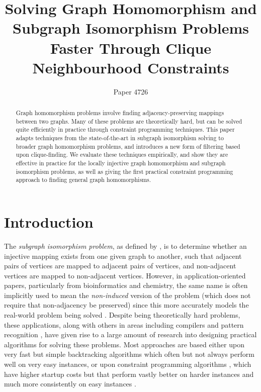 \documentclass{article}
\title{Solving Graph Homomorphism and Subgraph Isomorphism Problems Faster Through Clique Neighbourhood Constraints}
\author{Paper 4726}
\newcommand{\citet}[1]{\citeauthor{#1} \shortcite{#1}}
\begin{document}
\maketitle

\begin{abstract}
    Graph homomorphism problems involve finding adjacency-preserving mappings between two graphs.
    Many of these problems are theoretically hard, but can be solved quite efficiently in practice
    through constraint programming techniques.  This paper adapts techniques from the
    state-of-the-art in subgraph isomorphism solving to broader graph homomorphism problems, and
    introduces a new form of filtering based upon clique-finding. We evaluate these techniques
    empirically, and show they are effective in practice for the locally injective graph
    homomorphism and subgraph isomorphism problems, as well as giving the first practical constraint
    programming approach to finding general graph homomorphisms.
\end{abstract}

\section{Introduction}

The \emph{subgraph isomorphism problem}, as defined by \citet{DBLP:books/fm/GareyJ79}, is to
determine whether an injective mapping exists from one given graph to another, such that adjacent
pairs of vertices are mapped to adjacent pairs of vertices, and non-adjacent vertices are mapped to
non-adjacent vertices.  However, in application-oriented papers, particularly from bioinformatics
and chemistry, the same name is often implicitly used to mean the \emph{non-induced} version of the
problem (which does not require that non-adjacency be preserved) since this more accurately models
the real-world problem being solved \cite{Willett1999,EhrlichR11}. Despite being theoretically hard
problems, these applications, along with
others in areas including compilers \cite{DBLP:conf/cp/BlindellLCS15}
and pattern recognition \cite{DBLP:journals/ijprai/FoggiaPV14},
have given rise to a large amount of research into designing practical algorithms for solving these
problems.  Most approaches are based either upon very fast but simple backtracking algorithms
\cite{DBLP:journals/pami/CordellaFSV04,DBLP:journals/bmcbi/BonniciGPSF13,DBLP:conf/gbrpr/CarlettiFSV17}
which often but not always perform well on very easy instances, or upon constraint programming
algorithms
\cite{DBLP:journals/constraints/ZampelliDS10,DBLP:journals/ai/Solnon10,DBLP:conf/cp/AudemardLMGP14,DBLP:conf/cp/McCreeshP15,DBLP:conf/cpaior/ArchibaldDHMP019},
which have higher startup costs but that perform vastly better on harder instances and much more
consistently on easy instances \cite{DBLP:journals/jair/McCreeshPST18,DBLP:conf/gbrpr/Solnon19}.
\end{document}
